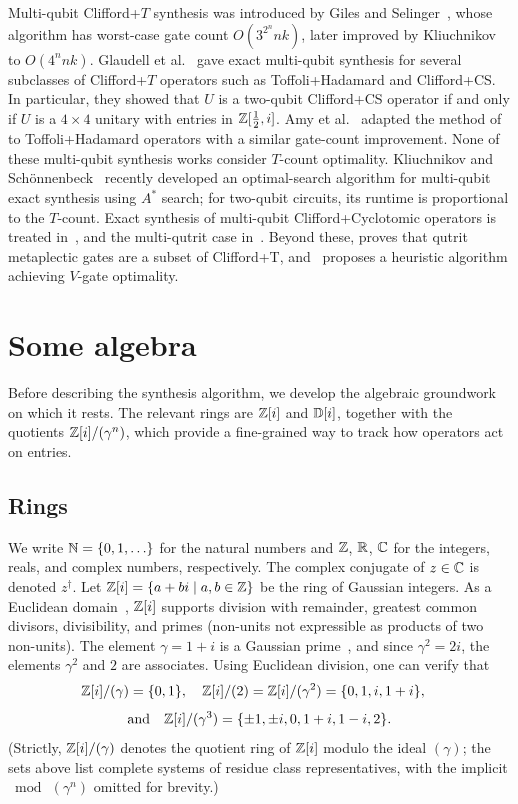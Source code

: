 \documentclass[reprint,amsmath,amssymb,aps,pra]{revtex4-2}
\begin{document}
Multi-qubit Clifford+$T$ synthesis was introduced by Giles and
Selinger~\cite{GilesSelinger2013}, whose algorithm has worst-case gate
count $O(3^{2^n} n k)$, later improved by
Kliuchnikov~\cite{kliuchnikov2013} to $O(4^n n k)$. Glaudell et
al.~\cite{Amy-Glaudell-Ross} gave exact multi-qubit synthesis for
several subclasses of Clifford+$T$ operators such as Toffoli+Hadamard
and Clifford+CS. In particular, they showed that $U$ is a two-qubit
Clifford+CS operator if and only if $U$ is a $4\times 4$ unitary with
entries in $\mathbb{Z}[\tfrac{1}{2}, i]$. Amy et al.~\cite{amy2023improved}
adapted the method of~\cite{kliuchnikov2013} to Toffoli+Hadamard
operators with a similar gate-count improvement. None of these
multi-qubit synthesis works consider $T$-count optimality. Kliuchnikov
and Sch\"onnenbeck~\cite{KliuchnikovSchonnenbeck2024} recently
developed an optimal-search algorithm for multi-qubit exact synthesis
using $A^*$ search; for two-qubit circuits, its runtime is
proportional to the $T$-count. Exact synthesis of multi-qubit
Clifford+Cyclotomic operators is treated
in~\cite{Glaudell2024a,Dinh_2025}, and the multi-qutrit case
in~\cite{Glaudell2024b,Amolak2024}. Beyond these,
\cite{glaudell-metaplectic} proves that qutrit metaplectic gates are a
subset of Clifford+T, and~\cite{Mukhopadhyay2024b} proposes a
heuristic algorithm achieving $V$-gate optimality.

\section{Some algebra}
\label{sec:algebra}

Before describing the synthesis algorithm, we develop the algebraic
groundwork on which it rests. The relevant rings are $\mathbb{Z} [i]$ and ${\mathbb D} [i]$,
together with the quotients $\mathbb{Z} [i]/(\gamma^n)$, which provide a
fine-grained way to track how operators act on entries.

\subsection{Rings}

We write ${\mathbb N}=\left\{0,1,\ldots\right\}$ for the natural numbers and $\mathbb{Z}$, ${\mathbb R}$,
${\mathbb C}$ for the integers, reals, and complex numbers, respectively. The
complex conjugate of $z \in {\mathbb C}$ is denoted $z^{\dagger}$. Let
$\mathbb{Z}[i]=\left\{a+bi\mid a,b\in\mathbb{Z}\right\}$ be the ring of Gaussian integers. As a
Euclidean domain~\cite{Bian_ED}, $\mathbb{Z} [i]$ supports division with
remainder, greatest common divisors, divisibility, and primes
(non-units not expressible as products of two non-units). The element
$\gamma = 1+i$ is a Gaussian prime~\cite{ant-book}, and since
$\gamma^2 = 2i$, the elements $\gamma^2$ and $2$ are associates.
Using Euclidean division, one can verify that
\[
  \mathbb{Z} [i]/(\gamma) = \{0,1\},\quad \mathbb{Z} [i] /(2) = \mathbb{Z} [i]/(\gamma^2) = \{0,1,i,
  1+i\},\quad
\]
\[
  \text{and}\quad \mathbb{Z} [i] /(\gamma^3) = \{\pm 1,\pm i, 0, 1+i, 1- i, 2\}.
\]
(Strictly, $\mathbb{Z} [i]/(\gamma)$ denotes the quotient ring of $\mathbb{Z} [i]$ modulo
the ideal $(\gamma)$; the sets above list complete systems of residue
class representatives, with the implicit $\bmod\,(\gamma^n)$ omitted
for brevity.)
\end{document}
